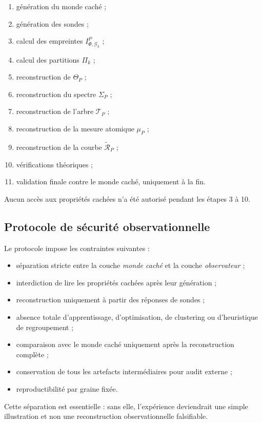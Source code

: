 \documentclass[11pt,a4paper]{article}
\begin{document}
\begin{appendices}
\begin{enumerate}
\item génération du monde caché ;
\item génération des sondes ;
\item calcul des empreintes \(I_{\Phi,\mathcal G_k}^P\) ;
\item calcul des partitions \(\Pi_k\) ;
\item reconstruction de \(\Theta_P\) ;
\item reconstruction du spectre \(\Sigma_P\) ;
\item reconstruction de l'arbre \(\mathcal T_P\) ;
\item reconstruction de la mesure atomique \(\mu_P\) ;
\item reconstruction de la courbe \(\widetilde{\mathcal R}_P\) ;
\item vérifications théoriques ;
\item validation finale contre le monde caché, uniquement à la fin.
\end{enumerate}

Aucun accès aux propriétés cachées n'a été autorisé pendant les étapes 3 à 10.

\subsection{Protocole de sécurité observationnelle}

Le protocole impose les contraintes suivantes :

\begin{itemize}[leftmargin=1.4em]
\item séparation stricte entre la couche \emph{monde caché} et la couche \emph{observateur} ;
\item interdiction de lire les propriétés cachées après leur génération ;
\item reconstruction uniquement à partir des réponses de sondes ;
\item absence totale d'apprentissage, d'optimisation, de clustering ou d'heuristique de regroupement ;
\item comparaison avec le monde caché uniquement après la reconstruction complète ;
\item conservation de tous les artefacts intermédiaires pour audit externe ;
\item reproductibilité par graine fixée.
\end{itemize}

Cette séparation est essentielle : sans elle, l'expérience deviendrait une simple illustration et non une reconstruction observationnelle falsifiable.


\end{appendices}
\end{document}
